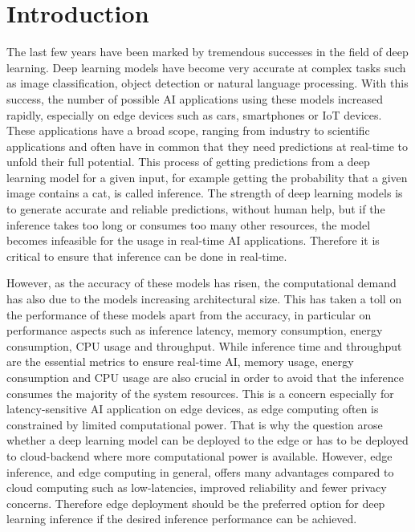 \chapter{Introduction}


The last few years have been marked by tremendous successes in the field of deep learning.
Deep learning models have become very accurate at complex tasks such as image classification, object detection or natural language processing. 
With this success, the number of possible AI applications using these models increased rapidly, especially on edge devices such as cars, smartphones or IoT devices.
These applications have a broad scope, ranging from industry to scientific applications and often have in common that they need predictions at real-time to unfold their full potential.
This process of getting predictions from a deep learning model for a given input, for example getting the probability that a given image contains a cat, is called inference.
The strength of deep learning models is to generate accurate and reliable predictions, without human help, but if the inference takes too long or consumes too many other resources, the model becomes infeasible for the usage in real-time AI applications.
Therefore it is critical to ensure that inference can be done in real-time.

However, as the accuracy of these models has risen, the computational demand has also due to the models increasing architectural size.
This has taken a toll on the performance of these models apart from the accuracy, in particular on performance aspects such as inference latency, memory consumption, energy consumption, CPU usage and throughput. 
While inference time and throughput are the essential metrics to ensure real-time AI, memory usage, energy consumption and CPU usage are also crucial in order to avoid that the inference consumes the majority of the system resources.
This is a concern especially for latency-sensitive AI application on edge devices, as edge computing often is constrained by limited computational power. 
That is why the question arose whether a deep learning model can be deployed to the edge or has to be deployed to cloud-backend where more computational power is available.
However, edge inference, and edge computing in general, offers many advantages compared to cloud computing such as low-latencies, improved reliability and fewer privacy concerns\cite{Mor:2018:EC:3305263.3313377}.
Therefore edge deployment should be the preferred option for deep learning inference if the desired inference performance can be achieved.


